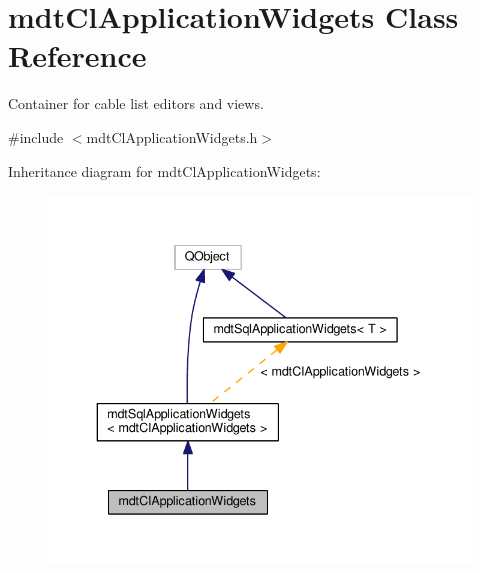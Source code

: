 \hypertarget{classmdt_cl_application_widgets}{\section{mdt\-Cl\-Application\-Widgets Class Reference}
\label{classmdt_cl_application_widgets}
}


Container for cable list editors and views.  




{\ttfamily \#include $<$mdt\-Cl\-Application\-Widgets.\-h$>$}



Inheritance diagram for mdt\-Cl\-Application\-Widgets\-:
\nopagebreak
\begin{figure}[H]
\begin{center}
\leavevmode
\includegraphics[width=339pt]{classmdt_cl_application_widgets__inherit__graph}
\end{center}
\end{figure}


